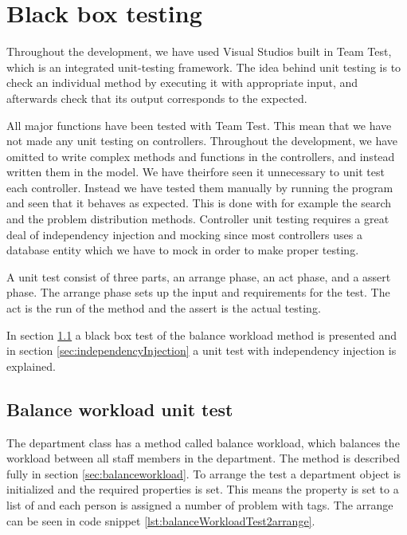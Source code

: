 \chapter{Black box testing}
\label{chap:testing}

Throughout the development, we have used Visual Studios built in Team Test, which is an integrated unit-testing framework. \cite{teamtest} 
The idea behind unit testing is to check an individual method by executing it with appropriate input, and afterwards check that its output corresponds to the expected.

All major functions have been tested with Team Test. This mean that we have not made any unit testing on controllers. 
Throughout the development, we have omitted to write complex methods and functions in the controllers, and instead written them in the model. We have theirfore seen it unnecessary to unit test each controller. Instead we have tested them manually by running the program and seen that it behaves as expected. 
This is done with for example the search and the problem distribution methods. 
Controller unit testing requires a great deal of independency injection and mocking since most controllers uses a database entity which we have to mock in order to make proper testing. 

A unit test consist of three parts, an arrange phase, an act phase, and a assert phase. 
The arrange phase sets up the input and requirements for the test. 
The act is the run of the method and the assert is the actual testing.  

In section \ref{sec:balWorUniTes} a black box test of the balance workload method is presented and in section \ref{sec:independencyInjection} a unit test with independency injection is explained. 



\section{Balance workload unit test}
\label{sec:balWorUniTes}
The department class has a method called balance workload, which balances the workload between all staff members in the department. 
The method is described fully in section \ref{sec:balanceworkload}. 
To arrange the test a department object is initialized and the required properties is set. This means the  property is set to a list of  and each person is assigned a number of problem with tags. 
The arrange can be seen in code snippet \ref{lst:balanceWorkloadTest2arrange}. 

